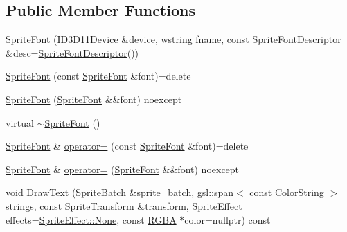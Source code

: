 \subsection*{Public Member Functions}
\begin{DoxyCompactItemize}
\item 
\hyperlink{classmage_1_1rendering_1_1_sprite_font_a6080794a32e8e4fa4b2be7392a4e9466}{Sprite\+Font} (I\+D3\+D11\+Device \&device, wstring fname, const \hyperlink{classmage_1_1rendering_1_1_sprite_font_descriptor}{Sprite\+Font\+Descriptor} \&desc=\hyperlink{classmage_1_1rendering_1_1_sprite_font_descriptor}{Sprite\+Font\+Descriptor}())
\item 
\hyperlink{classmage_1_1rendering_1_1_sprite_font_a80cfc8c939ee3709f7a6f9441a5bd688}{Sprite\+Font} (const \hyperlink{classmage_1_1rendering_1_1_sprite_font}{Sprite\+Font} \&font)=delete
\item 
\hyperlink{classmage_1_1rendering_1_1_sprite_font_a9a2014908c6c63aa9d9ad223383bd03a}{Sprite\+Font} (\hyperlink{classmage_1_1rendering_1_1_sprite_font}{Sprite\+Font} \&\&font) noexcept
\item 
virtual \hyperlink{classmage_1_1rendering_1_1_sprite_font_a51ec0418e1456d7634c6540ccc801644}{$\sim$\+Sprite\+Font} ()
\item 
\hyperlink{classmage_1_1rendering_1_1_sprite_font}{Sprite\+Font} \& \hyperlink{classmage_1_1rendering_1_1_sprite_font_a3d0054493b983437a392c807523d744e}{operator=} (const \hyperlink{classmage_1_1rendering_1_1_sprite_font}{Sprite\+Font} \&font)=delete
\item 
\hyperlink{classmage_1_1rendering_1_1_sprite_font}{Sprite\+Font} \& \hyperlink{classmage_1_1rendering_1_1_sprite_font_a95317d173b64565c6cba865ca524fe2f}{operator=} (\hyperlink{classmage_1_1rendering_1_1_sprite_font}{Sprite\+Font} \&\&font) noexcept
\item 
void \hyperlink{classmage_1_1rendering_1_1_sprite_font_a0be6671c77a11df1e11a7a1568caeb68}{Draw\+Text} (\hyperlink{classmage_1_1rendering_1_1_sprite_batch}{Sprite\+Batch} \&sprite\+\_\+batch, gsl\+::span$<$ const \hyperlink{classmage_1_1rendering_1_1_color_string}{Color\+String} $>$ strings, const \hyperlink{classmage_1_1_sprite_transform}{Sprite\+Transform} \&transform, \hyperlink{namespacemage_1_1rendering_a4dbc3536c87b906f1d41d863ec458e78}{Sprite\+Effect} effects=\hyperlink{namespacemage_1_1rendering_a4dbc3536c87b906f1d41d863ec458e78a6adf97f83acf6453d4a6a4b1070f3754}{Sprite\+Effect\+::\+None}, const \hyperlink{structmage_1_1_r_g_b_a}{R\+G\+BA} $\ast$color=nullptr) const
\item 

\end{DoxyCompactItemize}
